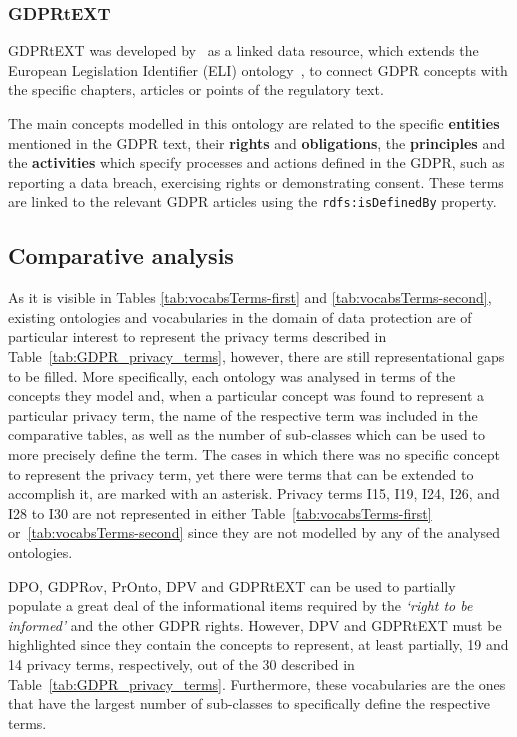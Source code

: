\subsubsection{GDPRtEXT}
\label{sec:gdprtext}

GDPRtEXT was developed by~\cite{gangemi_gdprtext_2018} as a linked data resource, which extends the European Legislation Identifier (ELI) ontology~\citep{office_of_publications_on_eur-lex_eu_2017}, to connect GDPR concepts with the specific chapters, articles or points of the regulatory text.

The main concepts modelled in this ontology are related to the specific \textbf{entities} mentioned in the GDPR text, their \textbf{rights} and \textbf{obligations}, the \textbf{principles} and the \textbf{activities} which specify processes and actions defined in the GDPR, such as reporting a data breach, exercising rights or demonstrating consent.
These terms are linked to the relevant GDPR articles using the \texttt{rdfs:isDefinedBy} property.

\subsection{Comparative analysis}
\label{sec:sota_vocabularies_analysis}


As it is visible in Tables \ref{tab:vocabsTerms-first} and \ref{tab:vocabsTerms-second}, existing ontologies and vocabularies in the domain of data protection are of particular interest to represent the privacy terms described in Table~\ref{tab:GDPR_privacy_terms}, however, there are still representational gaps to be filled.
More specifically, each ontology was analysed in terms of the concepts they model and, when a particular concept was found to represent a particular privacy term, the name of the respective term was included in the comparative tables, as well as the number of sub-classes which can be used to more precisely define the term.
The cases in which there was no specific concept to represent the privacy term, yet there were terms that can be extended to accomplish it, are marked with an asterisk. %
Privacy terms I15, I19, I24, I26, and I28 to I30 are not represented in either Table~\ref{tab:vocabsTerms-first} or~\ref{tab:vocabsTerms-second} since they are not modelled by any of the analysed ontologies. %

DPO, GDPRov, PrOnto, DPV and GDPRtEXT can be used to partially populate a great deal of the informational items required by the \textit{`right to be informed'} and the other GDPR rights. %
However, DPV and GDPRtEXT must be highlighted since they contain the concepts to represent, at least partially, 19 and 14 privacy terms, respectively, out of the 30 described in Table~\ref{tab:GDPR_privacy_terms}.
Furthermore, these vocabularies are the ones that have the largest number of sub-classes to specifically define the respective terms. %

